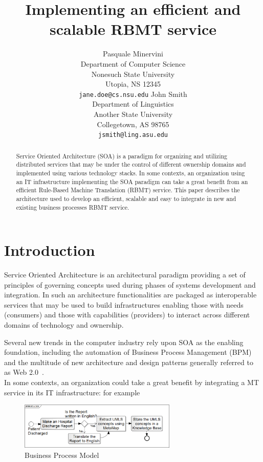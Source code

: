 \documentclass[11pt]{article}
\title{Implementing an efficient and scalable RBMT service}
\author{Pasquale Minervini\\
  Department of Computer Science \\
  Nonesuch State University \\
  Utopia, NS 12345 \\
  {\tt jane.doe@cs.nsu.edu} \And
  John Smith \\
  Department of Linguistics \\
  Another State University \\
  Collegetown, AS 98765 \\  
  {\tt jsmith@ling.asu.edu}}
\date{}
\begin{document}
\maketitle

\begin{abstract}
Service Oriented Architecture (SOA) is a paradigm for organizing and utilizing distributed services that may be under the 
control of different ownership domains and implemented using various technology stacks. In some contexts, an organization
using an IT infrastructure implementing the SOA paradigm can take a great benefit from an efficient Rule-Based Machine 
Translation (RBMT) service. This paper describes the architecture used to develop an efficient, scalable and easy to integrate
in new and existing business processes RBMT service.
\end{abstract}

\section{Introduction}

Service Oriented Architecture is an architectural paradigm providing  a set of principles of governing concepts used during phases 
of systems development and integration. In such an architecture functionalities are packaged as interoperable services that may be 
used to build infrastructures enabling those with needs (consumers) and those with capabilities (providers) to interact across 
different domains of technology and ownership.

Several new trends in the computer industry rely upon SOA as the enabling foundation, including the automation of Business Process 
Management (BPM) and the multitude of new architecture and design patterns generally referred to as Web 2.0~\cite{web20}.\\

In some contexts, an organization could take a great benefit by integrating a MT service in its IT infrastructure: for example 

\begin{figure}[!ht]
\begin{center}
\includegraphics[width=7.5cm]{mtsoa}
\end{center}
\caption{Business Process Model}
\label{fig:mtsoa}
\end{figure}
\end{document}
